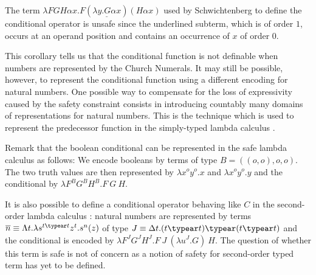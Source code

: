 \begin{example}
The term $\lambda F G H \alpha x . F ( \underline{\lambda y . G
\alpha x} ) (H \alpha x)$ used by Schwichtenberg
\cite{citeulike:622637} to define the conditional operator is unsafe
since the underlined subterm, which is of order $1$, occurs at an
operand position and contains an occurrence of $x$ of order $0$.
\end{example}

This corollary tells us that the conditional function is not
definable when numbers are represented by the Church Numerals. It
may still be possible, however, to represent the conditional
function using a different encoding for natural numbers. One
possible way to compensate for the loss of expressivity caused by
the safety constraint consists in introducing countably many domains
of representations for natural numbers. This is the technique which
is used to represent the predecessor function in the simply-typed
lambda calculus \cite{DBLP:journals/jacm/FortuneLO83}.

Remark that the boolean conditional can be represented in the safe
lambda calculus as follows: We encode booleans by terms of type
$B=((o,o),o,o)$. The two truth values are then represented by
$\lambda x^o y^o.x$ and $\lambda x^o y^o.y$ and the conditional by
$\lambda F^B G^B H^B . F~G~H$.

It is also possible to define a conditional operator behaving like
$C$ in the second-order lambda calculus
\cite{DBLP:journals/jacm/FortuneLO83}: natural numbers are
represented by terms $\overline{n} \equiv \Lambda t.\lambda
s^{t\typear t} z^t.s^n(z)$ of type $J \equiv \Delta t.(t\typear t)
\typear (t \typear t)$ and the conditional is encoded by $\lambda
F^J G^J H^J.F~J~(\lambda u^J . G)~H$. The question of whether this
term is safe is not of concern as a notion of safety for
second-order typed term has yet to be defined.






\newcommand{\zaioncencode}{\underline} %

\newcommand{\zaiwordtyp}{\mathbf{B}} %
\newcommand{\closedof}[1]{{\rm Cl}(#1)} %

\newcommand{\openedof}[2]{{\rm Op}(#1,#2)} %

